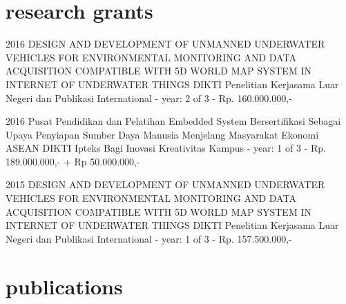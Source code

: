 \documentclass[style=verbose,maxnames=99,sorting=ydnt,backend=biber]{friggeri-cv} %
\begin{document}

\section{research grants}

\begin{entrylist}


\entry
{2016}
{DESIGN AND DEVELOPMENT OF UNMANNED UNDERWATER VEHICLES FOR ENVIRONMENTAL MONITORING AND DATA ACQUISITION COMPATIBLE WITH 5D WORLD MAP SYSTEM IN INTERNET OF UNDERWATER THINGS}
{DIKTI}
{Penelitian Kerjasama Luar Negeri dan Publikasi International - year: 2 of 3 - Rp. 160.000.000,-}

\entry
{2016}
{Pusat Pendidikan dan Pelatihan Embedded System Bersertifikasi Sebagai Upaya Penyiapan Sumber Daya Manusia Menjelang Masyarakat Ekonomi ASEAN}
{DIKTI}
{Ipteks Bagi Inovasi Kreativitas Kampus - year: 1 of 3 - Rp. 189.000.000,- + Rp 50.000.000,-}


\entry
{2015}
{DESIGN AND DEVELOPMENT OF UNMANNED UNDERWATER VEHICLES FOR ENVIRONMENTAL MONITORING AND DATA ACQUISITION COMPATIBLE WITH 5D WORLD MAP SYSTEM IN INTERNET OF UNDERWATER THINGS}
{DIKTI}
{Penelitian Kerjasama Luar Negeri dan Publikasi International - year: 1 of 3 - Rp. 157.500.000,-}


\end{entrylist}





\section{publications}




\nocite{*}


\printbibliography[type=inproceedings, title={Conferences/Proceedings}, heading=subbibliography]
\end{document}
